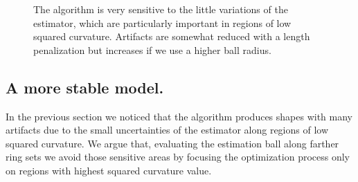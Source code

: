 \documentclass[runningheads]{llncs}
\newcommand{\jaco}[1]{{\textcolor{green!50!black}{#1}}}
\begin{document}
\begin{figure}[!ht]
\begin{minipage}[b]{0.33\textwidth}
{	}%
\end{minipage}%
\begin{minipage}[b]{0.33\textwidth}
\end{minipage}%
\caption{The algorithm is very sensitive to the little variations of the estimator, which are particularly important in regions of low squared curvature. Artifacts are somewhat reduced with a length penalization but increases if we use a higher ball radius. }
\label{fig:m1-square-flow}
\end{figure}


\subsection{A more stable model.}
In the previous section we noticed that the algorithm produces shapes
with many artifacts due to the small uncertainties of the estimator
along regions of low squared curvature. We argue that, evaluating the
estimation ball along farther ring sets we avoid those sensitive areas
by focusing the optimization process only on regions with highest
squared curvature value. 

\end{document}
